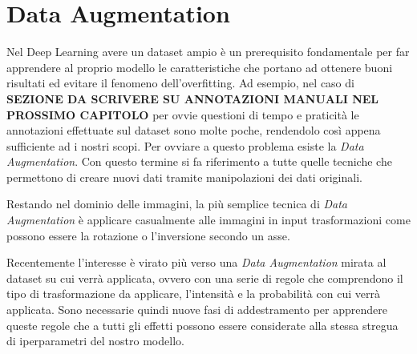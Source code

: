 \section{Data Augmentation}
\label{sec:data_augmentation}
Nel Deep Learning avere un dataset ampio è un prerequisito fondamentale per far apprendere al proprio modello le caratteristiche che portano ad ottenere buoni risultati ed evitare il fenomeno dell'overfitting. Ad esempio, nel caso di \textbf{SEZIONE DA SCRIVERE SU ANNOTAZIONI MANUALI NEL PROSSIMO CAPITOLO} per ovvie questioni di tempo e praticità le annotazioni effettuate sul dataset sono molte poche, rendendolo così appena sufficiente ad i nostri scopi. Per ovviare a questo problema esiste la \textit{Data Augmentation}. Con questo termine si fa riferimento a tutte quelle tecniche che permettono di creare nuovi dati tramite manipolazioni dei dati originali. 

Restando nel dominio delle immagini, la più semplice tecnica di \textit{Data Augmentation} è applicare casualmente alle immagini in input trasformazioni come possono essere la rotazione o l'inversione secondo un asse. 

Recentemente l'interesse è virato più verso una \textit{Data Augmentation} mirata al dataset su cui verrà applicata, ovvero con una serie di regole che comprendono il tipo di trasformazione da applicare, l'intensità e la probabilità con cui verrà applicata. Sono necessarie quindi nuove fasi di addestramento per apprendere queste regole che a tutti gli effetti possono essere considerate alla stessa stregua di iperparametri del nostro modello.
